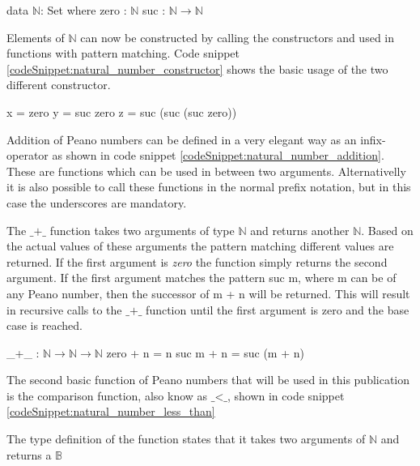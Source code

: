 \begin{codesnippet}[mathescape=true, caption={Definition of the peano natural numbers data type in Agda}, label={codeSnippet:natural_number}]
data $\mathbb{N}$: Set where
  zero : $\mathbb{N}$
  suc  : $\mathbb{N} \rightarrow \mathbb{N}$
\end{codesnippet}

Elements of $\mathbb{N}$ can now be constructed by calling the constructors and used in functions with pattern matching. 
Code snippet \ref{codeSnippet:natural_number_constructor} shows the basic usage of the two different constructor.

\begin{codesnippet}[mathescape=true, caption={Some peano numbers}, label={codeSnippet:natural_number_constructor}]
x = zero
y = suc zero
z = suc (suc (suc zero))
\end{codesnippet}

Addition of Peano numbers can be defined in a very elegant way as an infix-operator as shown in code snippet \ref{codeSnippet:natural_number_addition}. These are functions which can be used in between two arguments.
Alternativelly it is also possible to call these functions in the normal prefix notation, but in this case the underscores are mandatory.

The $\text{\_+\_}$ function takes two arguments of type $\mathbb{N}$ and returns another $\mathbb{N}$. Based on the actual values of these arguments the pattern matching different values are returned.
If the first argument is \emph{zero} the function simply returns the second argument.
If the first argument matches the pattern suc m, where m can be of any Peano number, then the successor of m + n will be returned.
This will result in recursive calls to the $\text{\_+\_}$  function until the first argument is zero and the base case is reached.

\begin{codesnippet}[mathescape=true, caption={Peano numbers addition}, label={codeSnippet:natural_number_addition}]
_+_ : $\mathbb{N} \rightarrow \mathbb{N} \rightarrow \mathbb{N}$
zero  + n = n
suc m + n = suc (m + n)
\end{codesnippet}

The second basic function of Peano numbers that will be used in this publication is the comparison function, also know as $\text{\_<\_}$, shown in code snippet \ref{codeSnippet:natural_number_less_than}

The type definition of the function states that it takes two arguments of $\mathbb{N}$ and returns a $\mathbb{B}$

